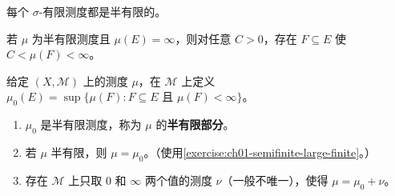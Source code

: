 \documentclass[../../main.tex]{subfiles}%
\begin{document}
\begin{exercise}\label{exercise:ch01-sigma-finite-semifinite}
每个 $\sigma$-有限测度都是半有限的。
\end{exercise}

\begin{exercise}\label{exercise:ch01-semifinite-large-finite}
若 $\mu$ 为半有限测度且 $\mu(E)=\infty$，则对任意 $C>0$，存在 $F\subseteq E$ 使 $C<\mu(F)<\infty$。
\end{exercise}

\begin{exercise}\label{exercise:ch01-semifinite-part}
给定 $(X,\mathscr{M})$ 上的测度 $\mu$，在 $\mathscr{M}$ 上定义 $\mu_0(E)=\sup\{\mu(F):F\subseteq E\text{ 且 }\mu(F)<\infty\}$。
\begin{enumerate}[label=\alph*.,ref=(\alph*)]
\item\label{item:ch01-semifinite-part-measure} $\mu_0$ 是半有限测度，称为 $\mu$ 的\textbf{半有限部分}。
\item\label{item:ch01-semifinite-part-equality} 若 $\mu$ 半有限，则 $\mu=\mu_0$。（使用\cref{exercise:ch01-semifinite-large-finite}。）
\item\label{item:ch01-semifinite-part-remainder} 存在 $\mathscr{M}$ 上只取 $0$ 和 $\infty$ 两个值的测度 $\nu$（一般不唯一），使得 $\mu=\mu_0+\nu$。
\end{enumerate}
\end{exercise}
\end{document}

